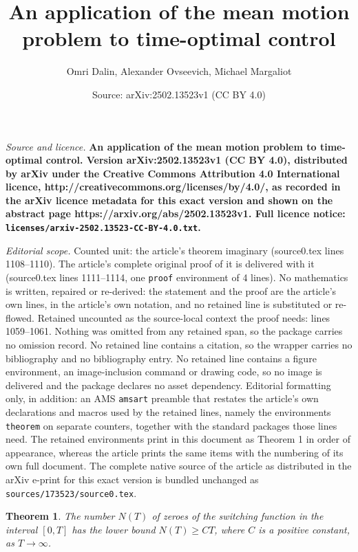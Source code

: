 \documentclass[10pt,a4paper]{amsart}
\title{\LARGE \bf An application of the mean motion problem to time-optimal control}
\author{Omri Dalin, Alexander Ovseevich, Michael Margaliot}
\date{Source: arXiv:2502.13523v1 (CC BY 4.0)}
\newtheorem{theorem}{Theorem}
\begin{document}
\maketitle

\noindent\emph{Source and licence.} \LARGE \bf An application of the mean motion problem to time-optimal control. Version arXiv:2502.13523v1 (CC BY 4.0), distributed by arXiv under the Creative Commons Attribution 4.0 International licence, http://creativecommons.org/licenses/by/4.0/, as recorded in the arXiv licence metadata for this exact version and shown on the abstract page https://arxiv.org/abs/2502.13523v1. Full licence notice: \texttt{licenses/arxiv-2502.13523-CC-BY-4.0.txt}.\par\smallskip

\noindent\textit{Editorial scope.} Counted unit: the article's theorem imaginary (source0.tex lines 1108--1110). The article's complete original proof of it is delivered with it (source0.tex lines 1111--1114, one \texttt{proof} environment of 4 lines). No mathematics is written, repaired or re-derived: the statement and the proof are the article's own lines, in the article's own notation, and no retained line is substituted or re-flowed.  Retained uncounted as the source-local context the proof needs: lines 1059--1061.  Nothing was omitted from any retained span, so the package carries no omission record.  No retained line contains a citation, so the wrapper carries no bibliography and no bibliography entry.  No retained line contains a figure environment, an image-inclusion command or drawing code, so no image is delivered and the package declares no asset dependency.  Editorial formatting only, in addition: an AMS \texttt{amsart} preamble that restates the article's own declarations and macros used by the retained lines, namely the environments \texttt{theorem} on separate counters, together with the standard packages those lines need.  The retained environments print in this document as Theorem 1 in order of appearance, whereas the article prints the same items with the numbering of its own full document.  The complete native source of the article as distributed in the arXiv e-print for this exact version is bundled unchanged as \texttt{sources/173523/source0.tex}.
\begin{theorem}\label{lower}
The number $N(T)$ of zeroes of the switching function in the interval $[0,T]$ has the lower bound $N(T)\geq CT$, where $C$ is a positive constant, as $T\to\infty$.
\end{theorem}
\end{document}
